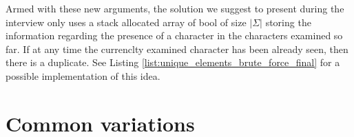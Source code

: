 Armed with these new arguments, the solution we suggest to present during the interview only uses a stack allocated array of bool of size $|\Sigma|$ storing
the information regarding the presence of a character in the characters examined so far. If at any time the currenclty examined character has been already seen, then there is a duplicate. See Listing \ref{list:unique_elements_brute_force_final} for a possible implementation of this idea.


	


\section{Common variations}
